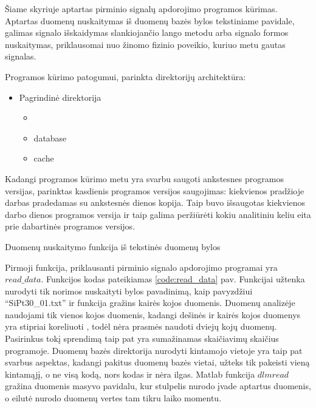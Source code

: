 \documentclass[]{vgtuef}
\begin{document}
Šiame skyriuje aptartas pirminio signalų apdorojimo programos kūrimas. Aptartas duomenų nuskaitymas iš duomenų bazės bylos tekstiniame pavidale, galimas signalo išskaidymas slankiojančio lango metodu arba signalo formos nuskaitymas, priklausomai nuo žinomo fizinio poveikio, kuriuo metu gautas signalas.

Programos kūrimo patogumui, parinkta direktorijų architektūra:

\begin{itemize}
\item Pagrindinė direktorija
  \begin{itemize}
  \item <programos versija, nurodyta datos formatu>
  \item database
  \item cache
  \end{itemize}
\end{itemize}

Kadangi programos kūrimo metu yra svarbu saugoti ankstesnes programos versijas, parinktas kasdienis programos versijos saugojimas: kiekvienos pradžioje darbas pradedamas su ankstesnės dienos kopija. Taip buvo išsaugotas kiekvienos darbo dienos programos versija ir taip galima peržiūrėti kokiu analitiniu keliu eita prie dabartinės programos versijos.


\begin{cfigure}
  \centering
  \caption{Duomenų nuskaitymo funkcija iš tekstinės duomenų bylos}
  \label{code:read_data}
  
\end{cfigure}

Pirmoji funkcija, priklausanti pirminio signalo apdorojimo programai yra $read\_data$. Funkcijos kodas pateikiamas \ref{code:read_data} pav. Funkcijai užtenka nurodyti tik norimos nuskaityti bylos pavadinimą, kaip pavyzdžiui ``SiPt30\_01.txt'' ir funkcija gražins kairės kojos duomenis. Duomenų analizėje naudojami tik vienos kojos duomenis, kadangi dešinės ir kairės kojos duomenys yra stipriai koreliuoti \cite{16053531}, todėl nėra prasmės naudoti dviejų kojų duomenų. Pasirinkus tokį sprendimą taip pat yra sumažinamas skaičiavimų skaičius programoje. Duomenų bazės direktorija nurodyti kintamojo vietoje yra taip pat svarbus aspektas, kadangi pakitus duomenų bazės vietai, užteks tik pakeisti vieną kintamąjį, o ne visą kodą, nors kodas ir nėra ilgas. Matlab funkcija $dlmread$ gražina duomenis masyvo pavidalu, kur stulpelis nurodo įvade aptartus duomenis, o eilutė nurodo duomenų vertes tam tikru laiko momentu.
\end{document}
